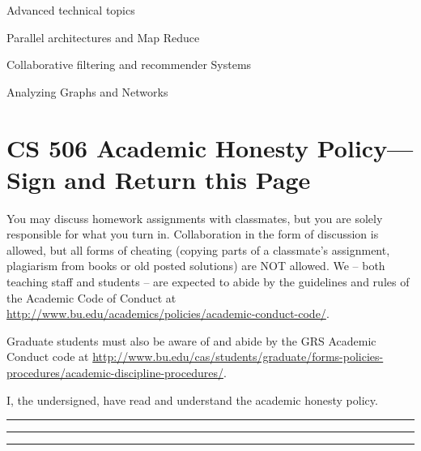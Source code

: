 \documentclass[11pt]{article}
\begin{document}
\begin{compactitem}
\item Advanced technical topics
  \begin{compactitem}
\item Parallel architectures and Map Reduce

  \item Collaborative filtering and recommender Systems


  \item Analyzing Graphs and Networks
  \end{compactitem}
\end{compactitem}

\newpage 
\section*{CS 506 Academic Honesty Policy---Sign and Return this Page}

You may discuss homework assignments with classmates, but you are 
solely responsible for what you turn in. Collaboration in the form of
discussion is allowed, but all forms of cheating (copying parts of a
classmate's assignment, plagiarism from books or old posted solutions)
are NOT allowed. We -- both teaching staff and students -- are expected
to abide by the guidelines and rules of the Academic Code of Conduct
at
\url{http://www.bu.edu/academics/policies/academic-conduct-code/}.

Graduate students must also be aware of and abide by the GRS Academic
Conduct code at
{\footnotesize \url{http://www.bu.edu/cas/students/graduate/forms-policies-procedures/academic-discipline-procedures/}.}

\vspace{0.3in} 
 I, the undersigned, have read and understand the academic honesty
policy. 


\vspace{0.3in} 

 \rule{3in}{0.5pt}

\vspace{0.3in} 
 \rule{3in}{0.5pt}

\vspace{0.3in} 
 \rule{3in}{0.5pt}
\end{document}
